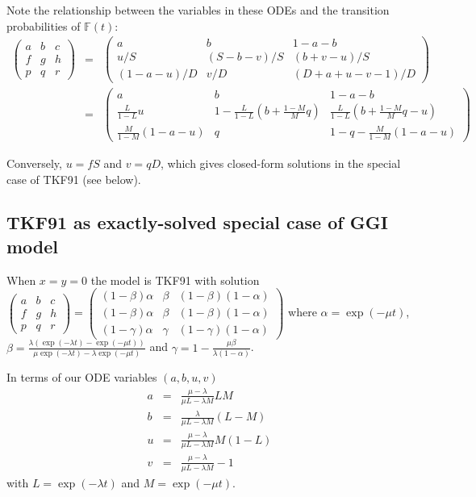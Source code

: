 \documentclass{article}
\begin{document}
Note the relationship between the variables in these ODEs and the transition probabilities of $\mathbb{F}(t)$:
\begin{eqnarray*}
\begin{pmatrix}
a & b & c \\
f & g & h \\
p & q & r 
\end{pmatrix}
& = &
\begin{pmatrix}
a & b & 1-a-b \\
u/S & (S-b-v)/S & (b+v-u)/S \\
(1-a-u)/D & v/D & (D+a+u-v-1)/D 
\end{pmatrix}
\\
& = &
\begin{pmatrix}
a & b & 1-a-b \\
\frac{L}{1-L} u & 1 - \frac{L}{1-L} \left( b + \frac{1-M}{M} q \right) & \frac{L}{1-L} (b + \frac{1-M}{M} q - u) \\
\frac{M}{1-M} (1 - a - u) & q & 1 - q -  \frac{M}{1-M} \left( 1 - a - u \right)
\end{pmatrix}
\end{eqnarray*}

Conversely, $u=fS$ and $v=qD$, which gives closed-form solutions in the special case of TKF91 (see below).



\subsection{TKF91 as exactly-solved special case of GGI model}

When $x=y=0$ the model is TKF91 \cite{ThorneEtAl91}
with solution
$
\begin{pmatrix}
a & b & c \\
f & g & h \\
p & q & r 
\end{pmatrix}
=
\begin{pmatrix}
(1-\beta)\alpha & \beta & (1-\beta)(1-\alpha) \\
(1-\beta)\alpha & \beta & (1-\beta)(1-\alpha) \\
(1-\gamma)\alpha & \gamma & (1-\gamma)(1-\alpha)
\end{pmatrix}
$
where
$\alpha = \exp(-\mu t)$,
$\beta = \frac{\lambda \left( \exp(-\lambda t) - \exp(-\mu t) \right)}{\mu \exp(-\lambda t) - \lambda \exp(-\mu t)}$
and
$\gamma = 1 - \frac{\mu \beta}{\lambda (1 - \alpha)}$.

In terms of our ODE variables $(a,b,u,v)$
\begin{eqnarray*}
  a & = & \frac{\mu - \lambda}{\mu L - \lambda M} LM \\
  b & = & \frac{\lambda}{\mu L - \lambda M} (L - M) \\
  u & = & \frac{\mu - \lambda}{\mu L - \lambda M} M(1-L) \\
  v & = & \frac{\mu - \lambda}{\mu L - \lambda M} - 1
\end{eqnarray*}
with $L=\exp(-\lambda t)$ and $M=\exp(-\mu t)$.
\end{document}
